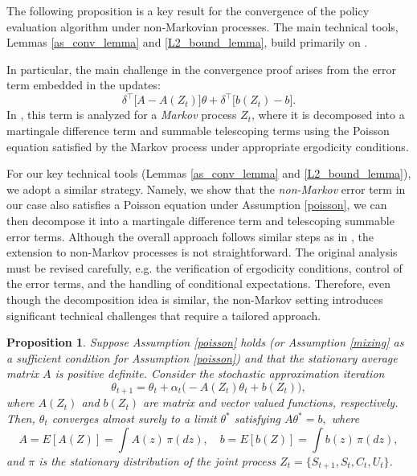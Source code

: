 \documentclass[11pt]{article}
\newtheorem{prop}{Proposition}
\begin{document}
The following proposition is a key result for the convergence of the policy evaluation algorithm under non-Markovian processes. The main technical tools, Lemmas \ref{as_conv_lemma} and \ref{L2_bound_lemma}, build primarily on \cite{benveniste2012adaptive}. 

In particular, the main challenge in the convergence proof arises from the error term embedded in the updates:
\[
\delta^\intercal \big[ A - A(Z_t) \big] \theta + \delta^\intercal \big[ b(Z_t) - b \big].
\]
In \cite{benveniste2012adaptive}, this term is analyzed for a \emph{Markov} process $Z_t$, where it is decomposed into a martingale difference term and summable telescoping terms using the Poisson equation satisfied by the Markov process under appropriate ergodicity conditions.  

For our key technical tools (Lemmas \ref{as_conv_lemma} and \ref{L2_bound_lemma}), we adopt a similar strategy. Namely, we show that the \emph{non-Markov} error term in our case also satisfies a Poisson equation under Assumption \ref{poisson}, we can then  decompose it into a martingale difference term and telescoping summable error terms. Although the overall approach follows similar steps as in \cite{benveniste2012adaptive}, the extension to non-Markov processes is not straightforward. The original analysis must be  revised  carefully, e.g. the verification of ergodicity conditions, control of the error terms, and the handling of conditional expectations. Therefore, even though the decomposition idea is similar, the non-Markov setting introduces significant technical challenges that require a tailored approach.


\begin{prop}\label{key_prop}
Suppose Assumption \ref{poisson} holds (or Assumption \ref{mixing} as a sufficient condition for Assumption \ref{poisson}) and that the stationary average matrix $A$ is positive definite. Consider the stochastic approximation iteration
\[
\theta_{t+1} = \theta_t + \alpha_t \big( -A(Z_t) \theta_t + b(Z_t) \big),
\]
where $A(Z_t)$ and $b(Z_t)$ are matrix and vector valued functions, respectively. Then, $\theta_t$ converges almost surely to a limit $\theta^*$ satisfying
$
A \theta^* = b,
$
where
\[
A = E[A(Z)] = \int A(z) \, \pi(dz), \quad 
b = E[b(Z)] = \int b(z) \, \pi(dz),
\]
and $\pi$ is the stationary distribution of the joint process $Z_t = \{S_{t+1}, S_t, C_t, U_t\}$.
\end{prop}
\end{document}
